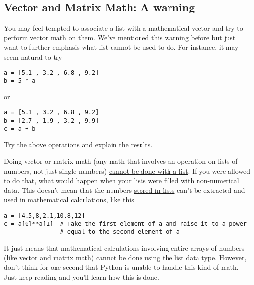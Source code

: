 \subsection*{Vector and Matrix Math: A warning}
 You may feel tempted to associate a
list with a mathematical vector and try to perform vector math on
them. We've mentioned this warning before but just want to further emphasis
what list cannot be used to do. For instance, it may seem natural to try
\begin{Verbatim}
a = [5.1 , 3.2 , 6.8 , 9.2]
b = 5 * a
\end{Verbatim}
or
\begin{Verbatim}
a = [5.1 , 3.2 , 6.8 , 9.2]
b = [2.7 , 1.9 , 3.2 , 9.9]
c = a + b
\end{Verbatim}
\begin{enumerate}
\prob  Try the above operations and explain the results.
\end{enumerate}
Doing vector or matrix math (any math that involves an operation on
lists of numbers, not just single numbers) \underline{cannot be done
  with a list}.  If you were allowed to do that, what would happen
when your lists were filled with non-numerical data.  This doesn't
mean that the numbers \ul{stored in lists} can't be extracted and used in
mathematical calculations, like this
\begin{Verbatim}
a = [4.5,8,2.1,10.8,12]
c = a[0]**a[1]  # Take the first element of a and raise it to a power
                # equal to the second element of a
\end{Verbatim}
It just means that mathematical calculations involving entire arrays
of numbers (like vector and matrix math) cannot be done using the list
data type.  However, don't think for one second that Python is unable
to handle this kind of math.  Just keep reading and you'll learn how
this is done.
